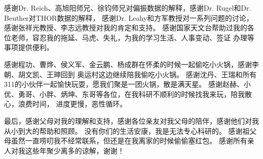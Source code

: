 感谢Dr. Reich、高旭阳师兄、徐钧师兄对偏振数据的解释，感谢Dr. Rugel和Dr. Beuther对THOR数据的解释，
感谢Dr. Leahy和方军教授对一系列问题的讨论，感谢张祥光教授、李志远教授对我的肯定和支持。
感谢国家天文台帮助过我的各位老师，容忍我的拖延、马虎、失礼，为我的学习生活、人事变动、签证
办理等事项提供便利。

感谢程功、曹烨、侯义军、金云鹏、杨成群在怀柔的时候一起偷吃小火锅，感谢李朝、胡文凯、王珅回到
奥运村这边继续陪我偷吃小火锅。
感谢沈丹、王瑞和所有311的小伙伴一起愉快玩耍，愿我们聚是一团火锅，散是满天星。
感谢赵赫、小优、勇哥、小胖、炳坤、东哥等各位，在我科研不顺利的时候找我来玩，陪我散心，浪费时间，
进度更慢，恶性循环。

最后，感谢父母对我的理解和支持，感谢各位亲友对我父母的陪伴，感谢他们对我从小到大的帮助和照顾。
没有你们的生活安康，我是无法专心科研的。
感谢祖父母虽然一直唠叨我不经常联系，但还是在我离家的时候偷偷塞红包。
感谢所有亲人对我这些年聚少离多的谅解，谢谢！

\cleardoublepage[plain]%
